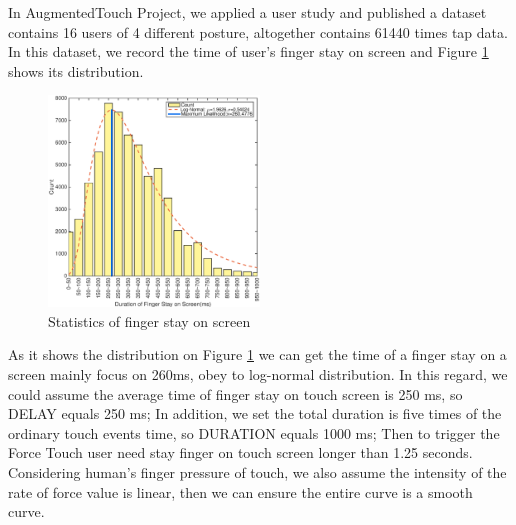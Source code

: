 In AugmentedTouch Project\cite{Changkun:2016}, we applied a user study and published a dataset contains 16 users of 4 different posture, altogether contains 61440 times tap data. In this dataset, we record the time of user's finger stay on screen and Figure \ref{fig:result} shows its distribution.

\begin{figure}[H]
    \kaishu
    \centering
    \includegraphics[width=0.5\textwidth]{figures/count-result}
    \caption{\kaishu Statistics of finger stay on screen}
    \label{fig:result}
\end{figure}

As it shows the distribution on Figure \ref{fig:result} we can get the time of a finger stay on a screen mainly focus on 260ms, obey to log-normal distribution.
In this regard, we could assume the average time of finger stay on touch screen is 250 ms, so DELAY equals 250 ms;
In addition, we set the total duration is five times of the ordinary touch events time, so DURATION equals 1000 ms;
Then to trigger the Force Touch user need stay finger on touch screen longer than 1.25 seconds.
Considering human's finger pressure of touch, we also assume the intensity of the rate of force value is linear, then we can ensure the entire curve is a smooth curve.


